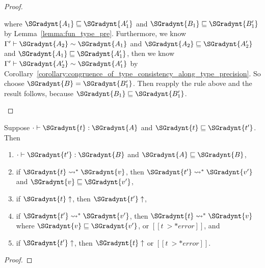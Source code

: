 \begin{proof}
\begin{itemize}
    where $ \SGradynt{A_{{\mathrm{1}}}}  \sqsubseteq  \SGradynt{A'_{{\mathrm{1}}}} $ and $ \SGradynt{B_{{\mathrm{1}}}}  \sqsubseteq  \SGradynt{B'_{{\mathrm{1}}}} $ by Lemma~\ref{lemma:fun_type_pre}.
    Furthermore, we know $ \Gamma'  \vdash  \SGradynt{A_{{\mathrm{2}}}}  \sim  \SGradynt{A_{{\mathrm{1}}}} $ and $ \SGradynt{A_{{\mathrm{2}}}}  \sqsubseteq  \SGradynt{A'_{{\mathrm{2}}}} $ and $ \SGradynt{A_{{\mathrm{1}}}}  \sqsubseteq  \SGradynt{A'_{{\mathrm{1}}}} $, then
    we know $ \Gamma'  \vdash  \SGradynt{A'_{{\mathrm{2}}}}  \sim  \SGradynt{A'_{{\mathrm{1}}}} $ by Corollary~\ref{corollary:congruence_of_type_consistency_along_type_precision}.
    So choose $\SGradynt{B} = \SGradynt{B'_{{\mathrm{1}}}}$. Then reapply the rule above and the result follows, because
    $ \SGradynt{B_{{\mathrm{1}}}}  \sqsubseteq  \SGradynt{B'_{{\mathrm{1}}}} $.
  \end{itemize}
\end{proof}

\begin{theorem}
  \label{thm:gradual_guarantee}
  Suppose $  \cdot   \vdash  \SGradynt{t}  :  \SGradynt{A} $ and $ \SGradynt{t}  \sqsubseteq  \SGradynt{t'} $.  Then
  \begin{enumerate}[label=\roman*., align=left]     
  \item $  \cdot   \vdash  \SGradynt{t'}  :  \SGradynt{B} $ and $ \SGradynt{A}  \sqsubseteq  \SGradynt{B} $,
  \item if $ \SGradynt{t}  \rightsquigarrow^*  \SGradynt{v} $, then $ \SGradynt{t'}  \rightsquigarrow^*  \SGradynt{v'} $ and $ \SGradynt{v}  \sqsubseteq  \SGradynt{v'} $,
  \item if $ \SGradynt{t}  \uparrow $, then $ \SGradynt{t'}  \uparrow $,
  \item if $ \SGradynt{t'}  \rightsquigarrow^*  \SGradynt{v'} $, then $ \SGradynt{t}  \rightsquigarrow^*  \SGradynt{v} $ where $ \SGradynt{v}  \sqsubseteq  \SGradynt{v'} $, or $[[t ~>* error]]$, and
  \item if $ \SGradynt{t'}  \uparrow $, then $ \SGradynt{t}  \uparrow $ or $[[t ~>* error]]$.
  \end{enumerate}
\end{theorem}
\begin{proof}
  
\end{proof}

